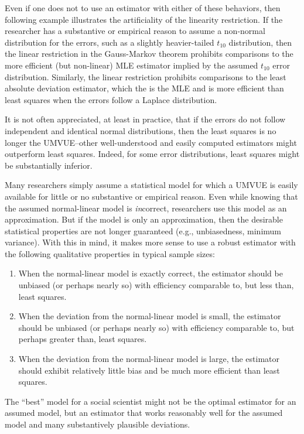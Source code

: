 \documentclass[12pt]{article}
\begin{document}
Even if one does not to use an estimator with either of these behaviors, then following example illustrates the artificiality of the linearity restriction. 
If the researcher has a substantive or empirical reason to assume a non-normal distribution for the errors, such as a slightly heavier-tailed $t_{10}$ distribution, then the linear restriction in the Gauss-Markov theorem prohibits comparisons to the more efficient (but non-linear) MLE estimator implied by the assumed $t_{10}$ error distribution. 
Similarly, the linear restriction prohibits comparisons to the least absolute deviation estimator, which the is the MLE and is more efficient than least squares when the errors follow a Laplace distribution. 

It is not often appreciated, at least in practice, that if the errors do not follow independent and identical normal distributions, then the least squares is no longer the UMVUE--other well-understood and easily computed estimators might outperform least squares. 
Indeed, for some error distributions, least squares might be substantially inferior.

Many researchers simply assume a statistical model for which a UMVUE is easily available for little or no substantive or empirical reason. 
Even while knowing that the assumed normal-linear model is \textit{in}correct, researchers use this model as an approximation. But if the model is only an approximation, then the desirable statistical properties are not longer guaranteed (e.g., unbiasedness, minimum variance). 
With this in mind, it makes more sense to use a robust estimator with the following qualitative properties in typical sample sizes:
\begin{enumerate}
\item When the normal-linear model is exactly correct, the estimator should be unbiased (or perhaps nearly so) with efficiency comparable to, but less than, least squares.
\item When the deviation from the normal-linear model is small, the estimator should be unbiased  (or perhaps nearly so) with efficiency comparable to, but perhaps greater than, least squares.
\item When the deviation from the normal-linear model is large, the estimator should exhibit relatively little bias and be much more efficient than least squares.
\end{enumerate}
\noindent The ``best'' model for a social scientist might not be the optimal estimator for an assumed model, but an estimator that works reasonably well for the assumed model and many substantively plausible deviations. 
\end{document}
